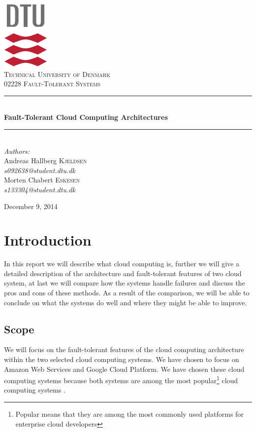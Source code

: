 \documentclass[11pt]{report}
\newcommand{\HRule}{\rule{\linewidth}{0.5mm}}
\begin{document}
\begin{titlepage}
\begin{center}

\includegraphics[scale=2.0]{../GFX/dtu_logo.pdf}\\[1cm]
\textsc{\LARGE Technical University of Denmark}\\[1.5cm]
\textsc{\Large 02228 Fault-Tolerant Systems}\\[0.5cm]

\HRule \\[0.4cm]
{\huge \bfseries Fault-Tolerant Cloud Computing Architectures}\\[0.1cm]
\HRule \\[1.5cm]

{\large
\emph{Authors:} \\[10pt]
Andreas Hallberg \textsc{Kjeldsen}\\
\emph{s092638@student.dtu.dk} \\[10pt]
Morten Chabert \textsc{Eskesen}\\
\emph{s133304@student.dtu.dk}
}
\vfill

{\large December 9, 2014}

\end{center}
\end{titlepage}

\chapter{Introduction}
In this report we will describe what cloud computing is, further we will give a detailed description of the architecture and fault-tolerant features of two cloud system, at last we will compare how the systems handle failures and discuss the pros and cons of these methods. As a result of the comparison, we will be able to conclude on what the systems do well and where they might be able to improve.

\section{Scope}
We will focus on the fault-tolerant features of the cloud computing architecture within the two selected cloud computing systems. We have chosen to focus on Amazon Web Services and Google Cloud Platform. We have chosen these cloud computing systems because both systems are among the most popular\footnote{Popular means that they are among the most commonly used platforms for enterprise cloud developers} cloud computing systems \cite{cloudsurvey}.
\end{document}
